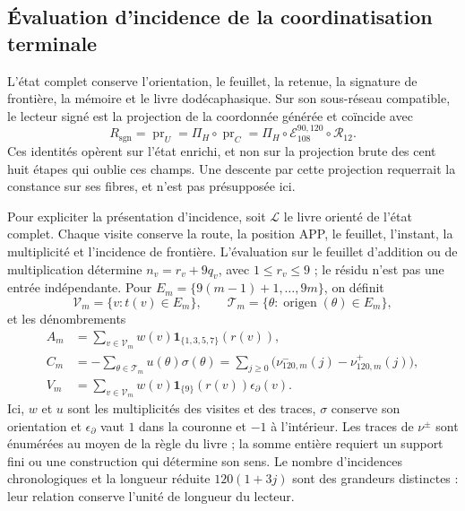 \subsection{Évaluation d'incidence de la coordinatisation terminale}
\label{subsec:k-incidencias-residentes}

L'état complet conserve l'orientation, le feuillet, la retenue, la signature de frontière,
la mémoire et le livre dodécaphasique. Sur son sous-réseau compatible, le lecteur signé
est la projection de la coordonnée générée et coïncide avec
\[
 R_{\mathrm{sgn}}=\operatorname{pr}_{U}
 =\Pi_H\circ\operatorname{pr}_{C}
 =\Pi_H\circ\mathcal E_{108}^{90,120}\circ\mathcal R_{12}.
\]
Ces identités opèrent sur l'état enrichi, et non sur la projection
brute des cent huit étapes qui oublie ces champs. Une descente par
cette projection requerrait la constance sur ses fibres, et n'est pas présupposée ici.

Pour expliciter la présentation d'incidence, soit \(\mathscr L\) le livre
orienté de l'état complet. Chaque visite conserve la route, la position APP, le feuillet,
l'instant, la multiplicité et l'incidence de frontière. L'évaluation sur le feuillet
d'addition ou de multiplication détermine \(n_v=r_v+9q_v\), avec \(1\leq r_v\leq9\) ;
le résidu n'est pas une entrée indépendante. Pour
\(E_m=\{9(m-1)+1,\ldots,9m\}\), on définit
\[
 \mathscr V_m=\{v:t(v)\in E_m\},\qquad
 \mathscr T_m=\{\theta:\operatorname{origen}(\theta)\in E_m\},
\]
et les dénombrements
\[
\begin{aligned}
 A_m&=\sum_{v\in\mathscr V_m}w(v)\mathbf1_{\{1,3,5,7\}}(r(v)),\\
 C_m&=-\sum_{\theta\in\mathscr T_m}u(\theta)\sigma(\theta)
     =\sum_{j\geq0}\bigl(\nu^-_{120,m}(j)-\nu^+_{120,m}(j)\bigr),\\
 V_m&=\sum_{v\in\mathscr V_m}w(v)\mathbf1_{\{9\}}(r(v))
                         \epsilon_\partial(v).
\end{aligned}
\]
Ici, \(w\) et \(u\) sont les multiplicités des visites et des traces,
\(\sigma\) conserve son orientation et \(\epsilon_\partial\) vaut \(1\) dans
la couronne et \(-1\) à l'intérieur. Les traces de \(\nu^\pm\) sont énumérées
au moyen de la règle du livre ; la somme entière requiert un support fini ou
une construction qui détermine son sens. Le nombre d'incidences
chronologiques et la longueur réduite \(120(1+3j)\) sont des grandeurs distinctes :
leur relation conserve l'unité de longueur du lecteur.

